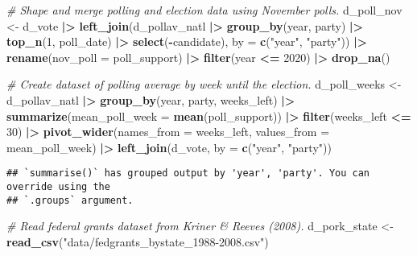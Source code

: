 \documentclass[
]{article}
\newenvironment{Shaded}{\begin{snugshade}}{\end{snugshade}}
\newcommand{\AttributeTok}[1]{\textcolor[rgb]{0.13,0.29,0.53}{#1}}
\newcommand{\CommentTok}[1]{\textcolor[rgb]{0.56,0.35,0.01}{\textit{#1}}}
\newcommand{\DecValTok}[1]{\textcolor[rgb]{0.00,0.00,0.81}{#1}}
\newcommand{\FunctionTok}[1]{\textcolor[rgb]{0.13,0.29,0.53}{\textbf{#1}}}
\newcommand{\NormalTok}[1]{#1}
\newcommand{\OtherTok}[1]{\textcolor[rgb]{0.56,0.35,0.01}{#1}}
\newcommand{\SpecialCharTok}[1]{\textcolor[rgb]{0.81,0.36,0.00}{\textbf{#1}}}
\newcommand{\StringTok}[1]{\textcolor[rgb]{0.31,0.60,0.02}{#1}}
\begin{document}
\begin{Shaded}
\begin{Highlighting}[]
\CommentTok{\# Shape and merge polling and election data using November polls. }
\NormalTok{d\_poll\_nov }\OtherTok{\textless{}{-}}\NormalTok{ d\_vote }\SpecialCharTok{|\textgreater{}} 
  \FunctionTok{left\_join}\NormalTok{(d\_pollav\_natl }\SpecialCharTok{|\textgreater{}} 
              \FunctionTok{group\_by}\NormalTok{(year, party) }\SpecialCharTok{|\textgreater{}} 
              \FunctionTok{top\_n}\NormalTok{(}\DecValTok{1}\NormalTok{, poll\_date) }\SpecialCharTok{|\textgreater{}} 
              \FunctionTok{select}\NormalTok{(}\SpecialCharTok{{-}}\NormalTok{candidate), }
            \AttributeTok{by =} \FunctionTok{c}\NormalTok{(}\StringTok{"year"}\NormalTok{, }\StringTok{"party"}\NormalTok{)) }\SpecialCharTok{|\textgreater{}} 
  \FunctionTok{rename}\NormalTok{(}\AttributeTok{nov\_poll =}\NormalTok{ poll\_support) }\SpecialCharTok{|\textgreater{}} 
  \FunctionTok{filter}\NormalTok{(year }\SpecialCharTok{\textless{}=} \DecValTok{2020}\NormalTok{) }\SpecialCharTok{|\textgreater{}} 
  \FunctionTok{drop\_na}\NormalTok{()}

\CommentTok{\# Create dataset of polling average by week until the election. }
\NormalTok{d\_poll\_weeks }\OtherTok{\textless{}{-}}\NormalTok{ d\_pollav\_natl }\SpecialCharTok{|\textgreater{}} 
  \FunctionTok{group\_by}\NormalTok{(year, party, weeks\_left) }\SpecialCharTok{|\textgreater{}}
  \FunctionTok{summarize}\NormalTok{(}\AttributeTok{mean\_poll\_week =} \FunctionTok{mean}\NormalTok{(poll\_support)) }\SpecialCharTok{|\textgreater{}} 
  \FunctionTok{filter}\NormalTok{(weeks\_left }\SpecialCharTok{\textless{}=} \DecValTok{30}\NormalTok{) }\SpecialCharTok{|\textgreater{}} 
  \FunctionTok{pivot\_wider}\NormalTok{(}\AttributeTok{names\_from =}\NormalTok{ weeks\_left, }\AttributeTok{values\_from =}\NormalTok{ mean\_poll\_week) }\SpecialCharTok{|\textgreater{}} 
  \FunctionTok{left\_join}\NormalTok{(d\_vote, }\AttributeTok{by =} \FunctionTok{c}\NormalTok{(}\StringTok{"year"}\NormalTok{, }\StringTok{"party"}\NormalTok{))}
\end{Highlighting}
\end{Shaded}

\begin{verbatim}
## `summarise()` has grouped output by 'year', 'party'. You can override using the
## `.groups` argument.
\end{verbatim}

\begin{Shaded}
\begin{Highlighting}[]
\CommentTok{\# Read federal grants dataset from Kriner \& Reeves (2008). }
\NormalTok{d\_pork\_state }\OtherTok{\textless{}{-}} \FunctionTok{read\_csv}\NormalTok{(}\StringTok{"data/fedgrants\_bystate\_1988{-}2008.csv"}\NormalTok{)}
\end{Highlighting}
\end{Shaded}
\end{document}
